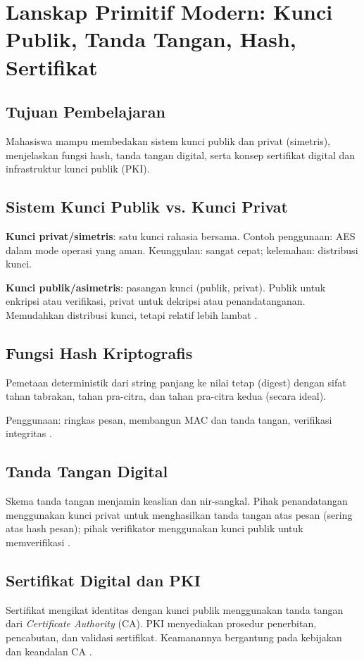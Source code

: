 \documentclass[../main.tex]{subfiles}
\begin{document}
\chapter{Lanskap Primitif Modern: Kunci Publik, Tanda Tangan, Hash, Sertifikat}

\section{Tujuan Pembelajaran}
Mahasiswa mampu membedakan sistem kunci publik dan privat (simetris), menjelaskan fungsi hash, tanda tangan digital, serta konsep sertifikat digital dan infrastruktur kunci publik (PKI).

\section{Sistem Kunci Publik vs. Kunci Privat}
\textbf{Kunci privat/simetris}: satu kunci rahasia bersama. Contoh penggunaan: AES dalam mode operasi yang aman. Keunggulan: sangat cepat; kelemahan: distribusi kunci.

\textbf{Kunci publik/asimetris}: pasangan kunci (publik, privat). Publik untuk enkripsi atau verifikasi, privat untuk dekripsi atau penandatanganan. Memudahkan distribusi kunci, tetapi relatif lebih lambat \citep{katzlindell,stallings}.

\section{Fungsi Hash Kriptografis}
\begin{definition}
Pemetaan deterministik dari string panjang ke nilai tetap (digest) dengan sifat tahan tabrakan, tahan pra-citra, dan tahan pra-citra kedua (secara ideal).
\end{definition}
Penggunaan: ringkas pesan, membangun MAC dan tanda tangan, verifikasi integritas \citep{menezes}.

\section{Tanda Tangan Digital}
Skema tanda tangan menjamin keaslian dan nir-sangkal. Pihak penandatangan menggunakan kunci privat untuk menghasilkan tanda tangan atas pesan (sering atas hash pesan); pihak verifikator menggunakan kunci publik untuk memverifikasi \citep{katzlindell}.

\section{Sertifikat Digital dan PKI}
Sertifikat mengikat identitas dengan kunci publik menggunakan tanda tangan dari \emph{Certificate Authority} (CA). PKI menyediakan prosedur penerbitan, pencabutan, dan validasi sertifikat. Keamanannya bergantung pada kebijakan dan keandalan CA \citep{stallings}.
\end{document}
